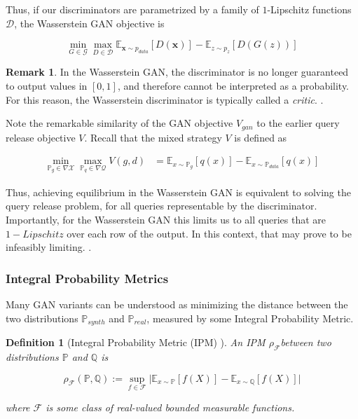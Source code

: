 \documentclass[]{article}
\newcommand{\X}{\mathcal{X}}
\newcommand{\Q}{\mathcal{Q}}
\newcommand{\F}{\mathcal{F}}
\newcommand{\E}{\mathbb{E}}
\newcommand{\p}{\mathbb{P}}
\newtheorem{definition}{Definition}[section]
\theoremstyle{definition}
\newtheorem{remark}{Remark}[section]
\begin{document}
    
    Thus, if our discriminators are parametrized by a family of $1$-Lipschitz functions $\mathcal{D}$, the Wasserstein GAN objective is
    
    \begin{equation}
        \min_{G \in \mathcal{G}} \max_{D \in \mathcal{D}} \mathbb{E}_{\mathbf{x} \sim p_{data}} [D(\mathbf{x})] - \mathbb{E}_{z \sim p_{z}} [D(G(z))]
    \end{equation}

\begin{remark}
    In the Wasserstein GAN, the discriminator is no longer guaranteed to output values in $[0,1]$, and therefore cannot be interpreted as a probability. For this reason, the Wasserstein discriminator is typically called a \emph{critic}. . 
\end{remark}

Note the remarkable similarity of the GAN objective $V_{gan}$ to the earlier query release objective $V$. Recall that the mixed strategy $V$ is defined as 

\begin{align*}
    \min_{\p_g \in \nabla \X} \max_{\p_q \in \nabla\Q }V(g,d) &= \E_{x \sim \p_g}[q(x)] - \E_{x \sim \p_{data}}[q(x)]
\end{align*} 

Thus, achieving equilibrium in the Wasserstein GAN is equivalent to solving the query release problem, for all queries representable by the discriminator. Importantly, for the Wasserstein GAN this limits us to all queries that are $1-Lipschitz$ over each row of the output. In this context, that may prove to be infeasibly limiting. .


\subsubsection{Integral Probability Metrics}

Many GAN variants can be understood as minimizing the distance between the two distributions $\p_{synth}$ and $\p_{real}$, measured by some Integral Probability Metric.

\begin{definition}[Integral Probability Metric (IPM) \cite{Mul97}]
    An IPM $\rho_\F$between two distributions $\mathbb{P}$ and $\mathbb{Q}$ is 

    \begin{equation}
        \rho_\F(\mathbb{P}, \mathbb{Q})  := \sup_{f \in \mathcal{F}} \big| \E_{x \sim \p}[f(X)] - \E_{x \sim \mathbb{Q}}[f(X)] \big|
    \end{equation}

    where $\F$ is some class of real-valued bounded measurable functions.
\end{definition}
\end{document}
